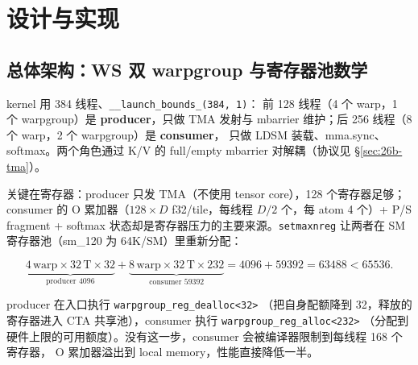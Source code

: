 \section{设计与实现}\label{sec:26b-design}

\subsection{总体架构：WS 双 warpgroup 与寄存器池数学}\label{sec:26b-arch}

kernel 用 384 线程、\texttt{\_\_launch\_\allowbreak{}bounds\_\allowbreak{}(384,~1)}：
前 128 线程（4 个 warp，1 个 warpgroup）是\textbf{ producer}，只做 TMA 发射与
mbarrier 维护；后 256 线程（8 个 warp，2 个 warpgroup）是\textbf{ consumer}，
只做 LDSM 装载、mma.sync、softmax。两个角色通过 K/V 的
full/empty mbarrier 对解耦（协议见 \S\ref{sec:26b-tma}）。

关键在寄存器：producer 只发 TMA（不使用 tensor core），128 个寄存器足够；
consumer 的 O 累加器（$128\times D$ f32/tile，每线程 $D/2$ 个，每 atom 4 个）+ P/S
fragment + softmax 状态却是寄存器压力的主要来源。\texttt{setmaxnreg} 让两者在
SM 寄存器池（sm\_120 为 64K/SM）里重新分配：

\begin{equation}\label{eq:26b-regpool}
  \underbrace{4\,\text{warp}\times 32\,\text{T}\times 32}_{\text{producer }4096}
  + \underbrace{8\,\text{warp}\times 32\,\text{T}\times 232}_{\text{consumer }59392}
  = 4096 + 59392 = 63488 < 65536 .
\end{equation}

producer 在入口执行 \texttt{warpgroup\_\allowbreak{}reg\_\allowbreak{}dealloc<32>}
（把自身配额降到 32，释放的寄存器进入 CTA 共享池），consumer 执行 \texttt{warpgroup\_\allowbreak{}reg\_\allowbreak{}alloc<232>}
（分配到硬件上限的可用额度）。没有这一步，consumer 会被编译器限制到每线程 168 个寄存器，
O 累加器溢出到 local memory，性能直接降低一半。

